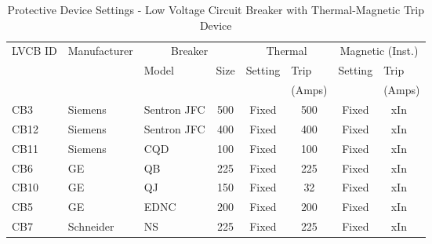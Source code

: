 \begin{table}[!htb]
	\caption{Protective Device Settings - Low Voltage Circuit Breaker with Thermal-Magnetic Trip Device}
	\label{tbl_ch04_elecaudit_tripsetting}
	{\scriptsize
		
\begin{tabular}{l|l|l|l|l|l|l|l}
	\hline
	LVCB ID & Manufacturer & \multicolumn{2}{c|}{Breaker} & \multicolumn{2}{c|}{Thermal} & \multicolumn{2}{c}{Magnetic (Inst.)} \\ 
	\cline{3-8}
	&  & Model & Size & Setting & Trip & Setting & Trip \\ 
	&  &  &  &  & (Amps) &  & (Amps) \\ 
\hline
CB3 & Siemens  & Sentron JFC & \multicolumn{1}{c|}{500} & \multicolumn{1}{c|}{Fixed} & \multicolumn{1}{c|}{500} & \multicolumn{1}{c|}{Fixed} & \multicolumn{1}{c}{xIn } \\ 
CB12 & Siemens & Sentron JFC & \multicolumn{1}{c|}{400} & \multicolumn{1}{c|}{Fixed} & \multicolumn{1}{c|}{400} & \multicolumn{1}{c|}{Fixed} & \multicolumn{1}{c}{xIn } \\ 
CB11 & Siemens & CQD & \multicolumn{1}{c|}{100} & \multicolumn{1}{c|}{Fixed} & \multicolumn{1}{c|}{100} & \multicolumn{1}{c|}{Fixed} & \multicolumn{1}{c}{xIn } \\ 
CB6 & GE & QB & \multicolumn{1}{c|}{225} & \multicolumn{1}{c|}{Fixed} & \multicolumn{1}{c|}{225} & \multicolumn{1}{c|}{Fixed} & \multicolumn{1}{c}{xIn } \\ 
CB10 & GE & QJ & \multicolumn{1}{c|}{150} & \multicolumn{1}{c|}{Fixed} & \multicolumn{1}{c|}{32} & \multicolumn{1}{c|}{Fixed} & \multicolumn{1}{c}{xIn } \\ 
CB5 & GE & EDNC & \multicolumn{1}{c|}{200} & \multicolumn{1}{c|}{Fixed} & \multicolumn{1}{c|}{200} & \multicolumn{1}{c|}{Fixed} & \multicolumn{1}{c}{xIn } \\ 
CB7 & Schneider & NS & \multicolumn{1}{c|}{225} & \multicolumn{1}{c|}{Fixed} & \multicolumn{1}{c|}{225} & \multicolumn{1}{c|}{Fixed} & \multicolumn{1}{c}{xIn } \\ 
\hline
\end{tabular}

		
	}%
\end{table}